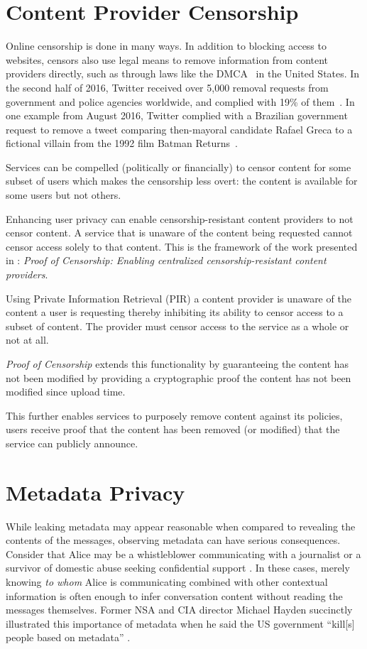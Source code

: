 \section{Content Provider Censorship}
Online censorship is done in many ways. In addition to blocking access to
websites, censors also use legal means to remove information from content
providers directly, such as through laws like the DMCA~\cite{dmca} in the United
States. In the second half of 2016, Twitter received over 5,000 removal requests
from government and police agencies worldwide, and complied with 19\% of
them~\cite{twitter-transparency}. In one example from August 2016, Twitter
complied with a Brazilian government request to remove a tweet comparing
then-mayoral candidate Rafael Greca to a fictional villain from the 1992 film
Batman Returns~\cite{twitter-rafael-greca}.

Services can be compelled (politically or financially) to censor content for
some subset of users which makes the censorship less overt: the content is
available for some users but not others. 

Enhancing user privacy can enable censorship-resistant content providers to not
censor content. A service that is unaware of the content being requested cannot
censor access solely to that content. This is the framework of the work
presented in : \emph{Proof of Censorship: Enabling centralized
censorship-resistant content providers}.

Using Private Information Retrieval (PIR) a content provider is unaware of the
content a user is requesting thereby inhibiting its ability to censor access to
a subset of content. The provider must censor access to the service as a whole
or not at all.

\emph{Proof of Censorship} extends this functionality by guaranteeing the
content has not been modified by providing a cryptographic proof the content has
not been modified since upload time.

This further enables services to purposely remove content against its policies,
users receive proof that the content has been removed (or modified) that the
service can publicly announce.

\section{Metadata Privacy}
While leaking metadata may appear reasonable when compared to revealing the
contents of the messages, observing metadata can have serious consequences.
Consider that Alice may be a whistleblower communicating with a journalist
\cite{190976} or a survivor of domestic abuse seeking confidential support
\cite{236244}. In these cases, merely knowing \emph{to whom} Alice is
communicating combined with other contextual information is often enough to
infer conversation content without reading the messages themselves. Former NSA
and CIA director Michael Hayden succinctly illustrated this importance of
metadata when he said the US government ``kill[s] people based on metadata''
\cite{haydenmetadata}.

